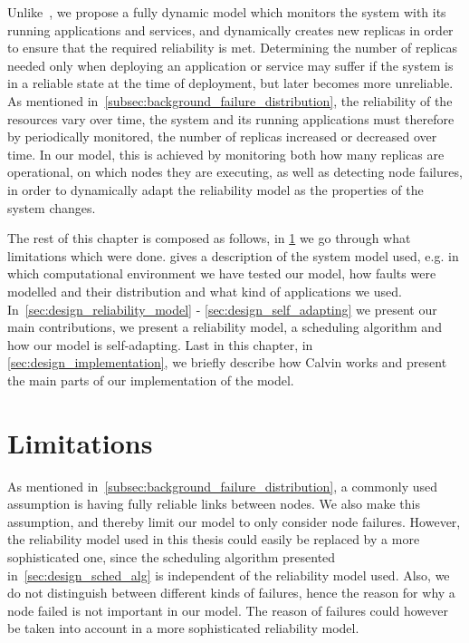 \documentclass{cslthse-msc}
\begin{document}
Unlike~\cite{designFaultTolerantSched, evalReplicationSched, taskSchedulingReplication, effTaskReplMobGrid, relGridServicePredConstraint}, we propose a fully dynamic model which monitors the system with its running applications and services, and dynamically creates new replicas in order to ensure that the required reliability is met. Determining the number of replicas needed only when deploying an application or service may suffer if the system is in a reliable state at the time of deployment, but later becomes more unreliable. As mentioned in~\cref{subsec:background_failure_distribution}, the reliability of the resources vary over time, the system and its running applications must therefore by periodically monitored, the number of replicas increased or decreased over time. In our model, this is achieved by monitoring both how many replicas are operational, on which nodes they are executing, as well as detecting node failures, in order to dynamically adapt the reliability model as the properties of the system changes.

The rest of this chapter is composed as follows, in \cref{sec:design_limitations} we go through what limitations which were done.  gives a description of the system model used, e.g. in which computational environment we have tested our model, how faults were modelled and their distribution and what kind of applications we used. In~\cref{sec:design_reliability_model} - \cref{sec:design_self_adapting} we present our main contributions, we present a reliability model, a scheduling algorithm and how our model is self-adapting. Last in this chapter, in \cref{sec:design_implementation}, we briefly describe how Calvin works and present the main parts of our implementation of the model.

\section{Limitations} \label{sec:design_limitations}
As mentioned in~\cref{subsec:background_failure_distribution}, a commonly used assumption is having fully reliable links between nodes. We also make this assumption, and thereby limit our model to only consider node failures. However, the reliability model used in this thesis could easily be replaced by a more sophisticated one, since the scheduling algorithm presented in~\cref{sec:design_sched_alg} is independent of the reliability model used. Also, we do not distinguish between different kinds of failures, hence the reason for why a node failed is not important in our model. The reason of failures could however be taken into account in a more sophisticated reliability model.
\end{document}

